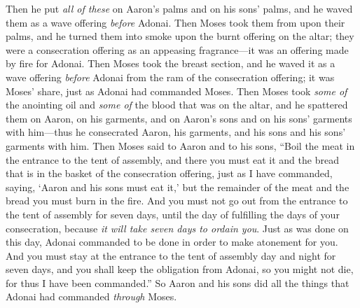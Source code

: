 \begin{biblechapter}
\verse Then he put \textit{all of these} on Aaron’s palms and on his sons’ palms, and he waved them as a wave offering \textit{before} Adonai.
\verse Then Moses took them from upon their palms, and he turned them into smoke upon the burnt offering on the altar; they were a consecration offering as an appeasing fragrance—it was an offering made by fire for Adonai.
\verse Then Moses took the breast section, and he waved it as a wave offering \textit{before} Adonai from the ram of the consecration offering; it was Moses’ share, just as Adonai had commanded Moses.
 Then Moses took \textit{some of} the anointing oil and \textit{some of} the blood that was on the altar, and he spattered them on Aaron, on his garments, and on Aaron’s sons and on his sons’ garments with him—thus he consecrated Aaron, his garments, and his sons and his sons’ garments with him.
\verse Then Moses said to Aaron and to his sons, “Boil the meat in the entrance to the tent of assembly, and there you must eat it and the bread that is in the basket of the consecration offering, just as I have commanded, saying, ‘Aaron and his sons must eat it,’
\verse but the remainder of the meat and the bread you must burn in the fire.
\verse And you must not go out from the entrance to the tent of assembly for seven days, until the day of fulfilling the days of your consecration, because \textit{it will take seven days to ordain you}.
\verse Just as was done on this day, Adonai commanded to be done in order to make atonement for you.
\verse And you must stay at the entrance to the tent of assembly day and night for seven days, and you shall keep the obligation from Adonai, so you might not die, for thus I have been commanded.”
\verse So Aaron and his sons did all the things that Adonai had commanded \textit{through} Moses.
\end{biblechapter}

